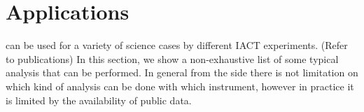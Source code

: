 \section{Applications}
\label{sec:applications}

\gammapy can be used for a variety of science cases by different IACT
experiments. (Refer to publications) In this section, we show a non-exhaustive
list of some typical analysis that can be performed. In general from the
\gammapy side there is not limitation on which kind of analysis can be done
with which instrument, however in practice it is limited by the availability of
public data.







